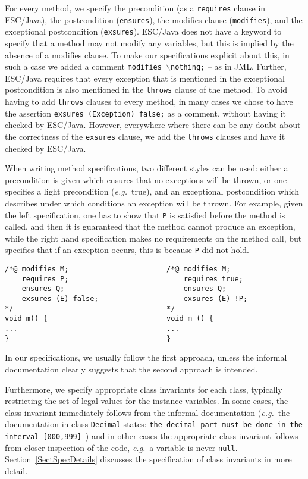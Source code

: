 \documentclass[a4paper]{llncs}
\newcommand{\noth}{\(\backslash\)\texttt{nothing}}
\begin{document}
For every method, we specify the precondition (as a \texttt{requires} clause
in ESC/Java), the postcondition (\texttt{ensures}), the modifies
clause (\texttt{modifies}), and the exceptional postcondition
(\texttt{exsures}). ESC/Java does not have a keyword to specify that a
method may not modify any variables, but this is implied by the
absence of a modifies clause. To make our specifications explicit
about this, in such a case we added a comment
\texttt{modifies \noth;} -- as in JML. Further, ESC/Java requires 
that every exception that is mentioned in the exceptional
postcondition is also mentioned in the \texttt{throws} clause of the
method. To avoid having to add \texttt{throws} clauses to every method,
in many cases we chose to have the assertion \texttt{exsures
(Exception) false;} as a comment, without having it checked by
ESC/Java. However, everywhere where there can be any doubt about the
correctness of the \texttt{exsures} clause, we add the \texttt{throws}
clauses and have it checked by ESC/Java.

When writing method specifications, two different styles can be used:
either a precondition is given which ensures that no exceptions
will be thrown, or one specifies a light precondition
(\emph{e.g.}~true), and an exceptional postcondition which describes
under which conditions an exception will be thrown. For example, given
the left specification, one has to show that \texttt{P} is satisfied
before the method is called, and then it is guaranteed that the method
cannot produce an exception, while the right hand specification makes
no requirements on the method call, but specifies that if an exception
occurs, this is because \texttt{P} did not hold.
\begin{verbatim}
/*@ modifies M;                       /*@ modifies M;
    requires P;                           requires true;
    ensures Q;                            ensures Q;
    exsures (E) false;                    exsures (E) !P;
*/                                    */
void m() {                            void m () {
...                                   ...
}                                     }
\end{verbatim}

In our specifications, we usually follow the first approach,
unless the informal documentation clearly suggests that the second
approach is intended.

Furthermore, we specify appropriate class invariants for each class,
typically restricting the set of legal values for the instance
variables. In some cases, the class invariant immediately follows from
the informal documentation (\emph{e.g.}~the documentation in class
\texttt{Decimal} states:
\texttt{the decimal part must be done in the interval 
[000,999]}~\cite{PurseUrl})
and in other cases the appropriate class
invariant follows from closer inspection of the code, \emph{e.g.}~a
variable is never \texttt{null}.  Section~\ref{SectSpecDetails}
discusses the specification of class invariants in more detail.
\end{document}

